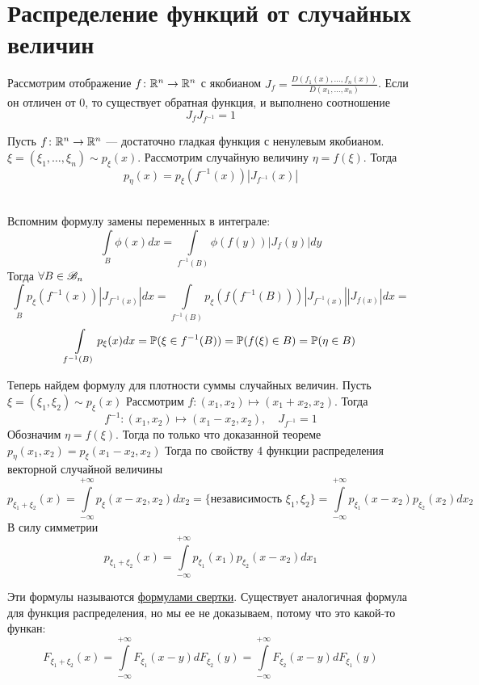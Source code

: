 \documentclass[../TV&MS.tex]{subfiles}
\begin{document}
    
\section{Распределение функций от случайных величин}
Рассмотрим отображение $f\colon \mathbb{R}^n \to \mathbb{R}^n$ с якобианом $J_f = \frac{D(f_1(x), \ldots, f_n(x))}{D(x_1, \ldots, x_n)}$.
Если он отличен от 0, то существует обратная функция, и выполнено соотношение
$$J_fJ_{f^{-1}} = 1$$

\begin{Th}
Пусть  $f\colon \mathbb{R}^n \to \mathbb{R}^n$ --- достаточно гладкая функция с ненулевым якобианом. $\xi = (\xi_1, \ldots, \xi_n) \sim p_\xi(x)$. Рассмотрим случайную величину $\eta = f(\xi)$. Тогда
$$p_\eta(x) = p_\xi(f^{-1}(x))|J_{f^{-1}}(x)|$$
\end{Th}
\begin{Proof} \\
Вспомним формулу замены переменных в интеграле:
$$\int\limits_B \phi(x)dx = \int\limits_{f^{-1}(B)} \phi(f(y))|J_f(y)|dy$$
Тогда $\forall B \in \mathscr{B}_n$
$$\int\limits_B p_\xi(f^{-1}(x))|J_{f^{-1}(x)}|dx = \int\limits_{f^{-1}(B)} p_\xi(f(f^{-1}(B)))|J_{f^{-1}(x)}||J_{f(x)}|dx =$$
$$ \int\limits_{f^{-1}(B)}p_\xi(x)dx = \mathbb{P}(\xi \in f^{-1}(B)) =\mathbb{P}(f(\xi) \in B) = \mathbb{P}(\eta \in B)$$
\end{Proof}

Теперь найдем формулу для плотности суммы случайных величин.
Пусть $\xi = (\xi_1, \xi_2) \sim p_\xi(x)$
Рассмотрим $f\colon (x_1, x_2) \mapsto (x_1 + x_2, x_2)$. Тогда $$f^{-1} \colon (x_1, x_2) \mapsto (x_1 - x_2, x_2), \quad J_{f^{-1}}=1$$
Обозначим $\eta = f(\xi)$. Тогда по только что доказанной теореме 
$p_\eta(x_1, x_2) = p_{\xi}(x_1 - x_2, x_2)$
Тогда по свойству 4 функции распределения векторной случайной величины
$$p_{\xi_1 + \xi_2}(x) = \int\limits_{-\infty}^{+\infty}p_\xi(x-x_2, x_2)dx_2 = \text{\{независимость $\xi_1, \xi_2$\}} = \int\limits_{-\infty}^{+\infty}p_{\xi_1}(x-x_2)p_{\xi_2}(x_2)dx_2$$
В силу симметрии 
$$p_{\xi_1 + \xi_2}(x) = \int\limits_{-\infty}^{+\infty}p_{\xi_1}(x_1)p_{\xi_2}(x - x_2)dx_1$$

Эти формулы называются \underline{формулами свертки}. Существует аналогичная формула для функция распределения, но мы ее не доказываем, потому что это какой-то функан:
$$F_{\xi_1 + \xi_2}(x) = \int\limits_{-\infty}^{+\infty}F_{\xi_1}(x-y)dF_{\xi_2}(y) = \int\limits_{-\infty}^{+\infty}F_{\xi_2}(x-y)dF_{\xi_1}(y)$$

\newpage
\end{document}
